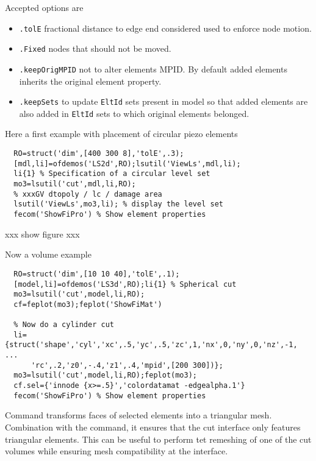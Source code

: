 
Accepted options are

\begin{itemize}
\item {\tt .tolE}  fractional distance to edge end considered used to
enforce node motion. 
\item {\tt .Fixed} nodes that should not be moved.
\item {\tt .keepOrigMPID} not to alter elements MPID.  By default added elements inherits the original element property.
\item {\tt .keepSets} to update {\tt EltId} sets present in model so that added elements are also added in {\tt EltId} sets to which original elements belonged.

\end{itemize}

Here a first example with placement of circular piezo elements 

\begin{verbatim}
  RO=struct('dim',[400 300 8],'tolE',.3);
  [mdl,li]=ofdemos('LS2d',RO);lsutil('ViewLs',mdl,li);
  li{1} % Specification of a circular level set
  mo3=lsutil('cut',mdl,li,RO);
  % xxxGV dtopoly / lc / damage area 
  lsutil('ViewLs',mo3,li); % display the level set
  fecom('ShowFiPro') % Show element properties
\end{verbatim}%

xxx show figure xxx 

Now a volume example

\begin{verbatim}
  RO=struct('dim',[10 10 40],'tolE',.1);
  [model,li]=ofdemos('LS3d',RO);li{1} % Spherical cut
  mo3=lsutil('cut',model,li,RO);
  cf=feplot(mo3);feplot('ShowFiMat')
  
  % Now do a cylinder cut
  li={struct('shape','cyl','xc',.5,'yc',.5,'zc',1,'nx',0,'ny',0,'nz',-1, ...
      'rc',.2,'z0',-.4,'z1',.4,'mpid',[200 300])};
  mo3=lsutil('cut',model,li,RO);feplot(mo3);
  cf.sel={'innode {x>=.5}','colordatamat -edgealpha.1'}
  fecom('ShowFiPro') % Show element properties
\end{verbatim}%


\vs

Command  transforms faces of selected elements into a triangular mesh. Combination with the  command, it ensures that the cut interface only features triangular elements. This can be useful to perform tet remeshing of one of the cut volumes while ensuring mesh compatibility at the interface.

